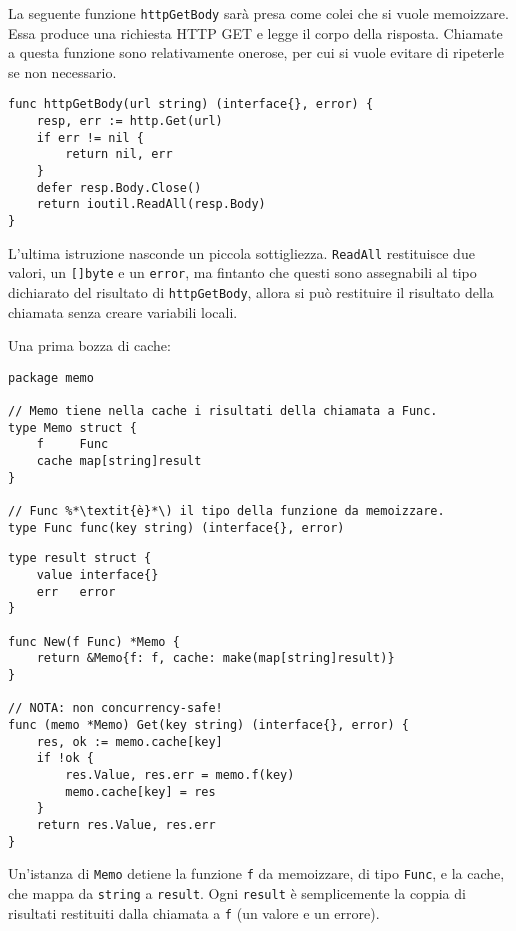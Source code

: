 La seguente funzione \verb|httpGetBody| sarà presa come colei che si vuole memoizzare.
Essa produce una richiesta HTTP GET e legge il corpo della risposta.
Chiamate a questa funzione sono relativamente onerose, per cui si vuole evitare di ripeterle se non necessario.
\begin{lstlisting}[frame=single, label={lst:lstlisting9-7.1}]
func httpGetBody(url string) (interface{}, error) {
    resp, err := http.Get(url)
    if err != nil {
        return nil, err
    }
    defer resp.Body.Close()
    return ioutil.ReadAll(resp.Body)
}
\end{lstlisting}
L'ultima istruzione nasconde un piccola sottigliezza.
\verb|ReadAll| restituisce due valori, un \verb|[]byte| e un \verb|error|, ma fintanto che questi sono assegnabili al tipo dichiarato del risultato di \verb|httpGetBody|, allora si può restituire il risultato della chiamata senza creare variabili locali.

Una prima bozza di cache:
\begin{lstlisting}[frame=single, label={lst:lstlisting9-7.2}]
package memo

// Memo tiene nella cache i risultati della chiamata a Func.
type Memo struct {
    f     Func
    cache map[string]result
}

// Func %*\textit{è}*\) il tipo della funzione da memoizzare.
type Func func(key string) (interface{}, error)
\end{lstlisting}
\begin{lstlisting}[frame=single, label={lst:lstlisting9-7.3}]
type result struct {
    value interface{}
    err   error
}

func New(f Func) *Memo {
    return &Memo{f: f, cache: make(map[string]result)}
}

// NOTA: non concurrency-safe!
func (memo *Memo) Get(key string) (interface{}, error) {
    res, ok := memo.cache[key]
    if !ok {
        res.Value, res.err = memo.f(key)
        memo.cache[key] = res
    }
    return res.Value, res.err
}
\end{lstlisting}
Un'istanza di \verb|Memo| detiene la funzione \verb|f| da memoizzare, di tipo \verb|Func|, e la cache, che mappa da \verb|string| a \verb|result|.
Ogni \verb|result| è semplicemente la coppia di risultati restituiti dalla chiamata a \verb|f| (un valore e un errore).

